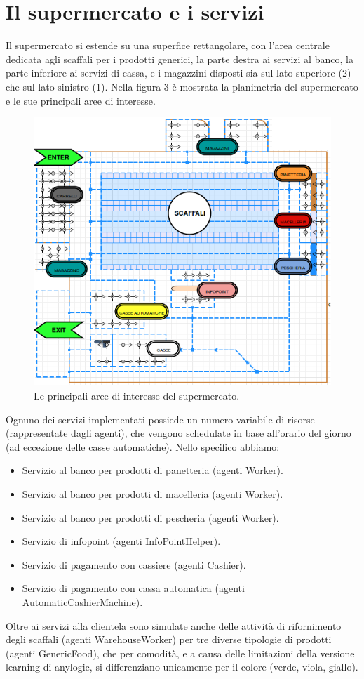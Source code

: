 \documentclass{article}
\begin{document}
\section{Il supermercato e i servizi}
Il supermercato si estende su una superfice rettangolare, con l'area centrale dedicata agli scaffali per i prodotti generici, la parte destra ai servizi al banco, la parte inferiore ai servizi di cassa, e i magazzini disposti sia sul lato superiore (2) che sul lato sinistro (1). Nella figura 3 è mostrata la planimetria del supermercato e le sue principali aree di interesse.
\begin{center}
\begin{figure}[h]
\center
\label{planim}
\includegraphics[scale=0.5]{./planimetria1.png}
\caption{\footnotesize{Le principali aree di interesse del supermercato.}}
\end{figure}
\end{center}
Ognuno dei servizi implementati possiede un numero variabile di risorse (rappresentate dagli agenti), che vengono schedulate in base all'orario del giorno (ad eccezione delle casse automatiche). Nello specifico abbiamo:
\begin{itemize}
\item Servizio al banco per prodotti di panetteria (agenti Worker).
\item Servizio al banco per prodotti di macelleria (agenti Worker).
\item Servizio al banco per prodotti di pescheria (agenti Worker).
\item Servizio di infopoint (agenti InfoPointHelper).
\item Servizio di pagamento con cassiere (agenti Cashier).
\item Servizio di pagamento con cassa automatica (agenti AutomaticCashierMachine).
\end{itemize}
Oltre ai servizi alla clientela sono simulate anche delle attività di rifornimento degli scaffali (agenti WarehouseWorker) per tre diverse tipologie di prodotti (agenti GenericFood), che per comodità, e a causa delle limitazioni della versione learning di anylogic, si differenziano unicamente per il colore (verde, viola, giallo).
\end{document}
